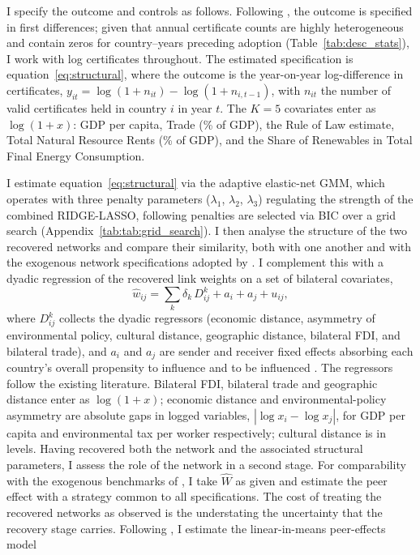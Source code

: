 \documentclass[12pt,a4paper]{article}
\begin{document}
I specify the outcome and controls as follows. Following \citet{depaula2025}, the outcome is specified in first differences; given that annual certificate counts are highly heterogeneous and contain zeros for country--years preceding adoption (Table~\ref{tab:desc_stats}), I work with log certificates throughout. The estimated specification is equation~\ref{eq:structural}, where the outcome is the year-on-year log-difference in certificates, $y_{it} = \log(1+n_{it}) - \log(1+n_{i,t-1})$, with $n_{it}$ the number of valid certificates held in country $i$ in year $t$. The $K=5$ covariates enter as $\log(1+x)$: GDP per capita, Trade (\% of GDP), the Rule of Law estimate, Total Natural Resource Rents (\% of GDP), and the Share of Renewables in Total Final Energy Consumption.

I estimate equation~\eqref{eq:structural} via the adaptive elastic-net GMM, which operates with three penalty parameters ($\lambda_1$, $\lambda_2$, $\lambda_3$) regulating the strength of the combined RIDGE-LASSO, following \citet{depaula2025} penalties are selected via BIC over a grid search (Appendix~\ref{tab:tab:grid_search}).
I then analyse the structure of the two recovered networks and compare their similarity, both with one another and with the exogenous network specifications adopted by \citet{albuquerque2007}. I complement this with a dyadic regression of the recovered link weights on a set of bilateral covariates,
\begin{equation}
    \hat w_{ij} = \sum_{k} \delta_k\, D_{ij}^{k} + a_i + a_j + u_{ij},
    \label{eq:dyadic}
\end{equation}
where $D_{ij}^{k}$ collects the dyadic regressors (economic distance, asymmetry of environmental policy, cultural distance, geographic distance, bilateral FDI, and bilateral trade), and $a_i$ and $a_j$ are sender and receiver fixed effects absorbing each country's overall propensity to influence and to be influenced \citet{dzemski2019}. The regressors follow the existing literature. Bilateral FDI, bilateral trade and geographic distance enter as $\log(1+x)$; economic distance and environmental-policy asymmetry are absolute gaps in logged variables, $|\log x_i - \log x_j|$, for GDP per capita and environmental tax per worker respectively; cultural distance is in levels.
Having recovered both the network and the associated structural parameters, I assess the role of the network in a second stage. For comparability with the exogenous benchmarks of \citet{albuquerque2007}, I take $\hat W$ as given and estimate the peer effect with a strategy common to all specifications. The cost of treating the recovered networks as observed is the understating the uncertainty that the recovery stage carries. Following \citet{bramoulle2009}, I estimate the linear-in-means peer-effects model
\end{document}
